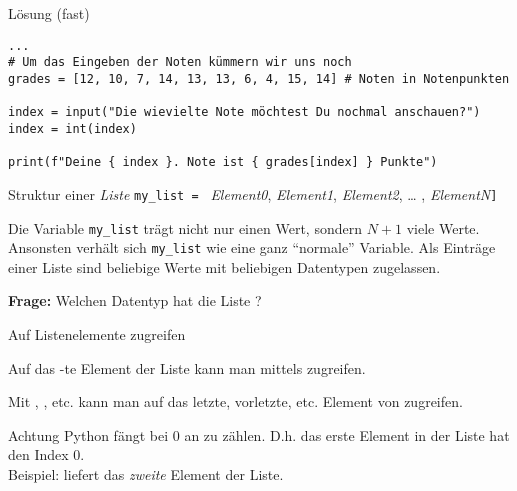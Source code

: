 \begin{fragile}{}
\begin{block}{Lösung \footnotesize(fast)}
\begin{verbatim}
...
# Um das Eingeben der Noten kümmern wir uns noch
grades = [12, 10, 7, 14, 13, 13, 6, 4, 15, 14] # Noten in Notenpunkten

index = input("Die wievielte Note möchtest Du nochmal anschauen?")
index = int(index)

print(f"Deine { index }. Note ist { grades[index] } Punkte")
\end{verbatim}
\end{block}
\end{fragile}


\begin{fragile}

\begin{block}{Struktur einer \emph{Liste}}
\vspace{2pt}
\large
\texttt{my\_list = }\pause {\Large\texttt{[}}\pause 
\emph{Element0}\pause,
\pause 
\emph{Element1}, \pause 
\emph{Element2}, \pause 
 \dots   
, \emph{ElementN}\pause \Large{\texttt{]}}
\end{block}

\pause 

Die Variable \texttt{my\_list} trägt nicht nur einen Wert, sondern $N+1$ viele Werte. Ansonsten verhält sich \texttt{my\_list} wie eine ganz \enquote{normale} Variable. 
Als Einträge einer Liste sind beliebige Werte mit beliebigen Datentypen zugelassen. 


\vspace{12pt}

\pause

\textbf{Frage:} Welchen Datentyp hat die Liste \py{[2, 2.3, "Hello"]} ? 
	
\end{fragile}

\begin{frame}
	
\begin{block}{Auf Listenelemente zugreifen}
	
	\vspace{2pt}
	
	Auf das -te Element der Liste  kann man mittels  zugreifen. 
	
	\pause 
	
    Mit  , , etc. kann man auf das letzte, vorletzte, etc. Element von  zugreifen. 
		
\end{block}

\pause 
\vspace{12pt}

\begin{alertblock}{Achtung}
\vspace{2pt}
Python fängt bei 0 an zu zählen. D.h. das erste Element in der Liste hat den Index 0. \\
Beispiel:  liefert das \emph{zweite} Element der Liste. 
\end{alertblock}

	
\end{frame}	


